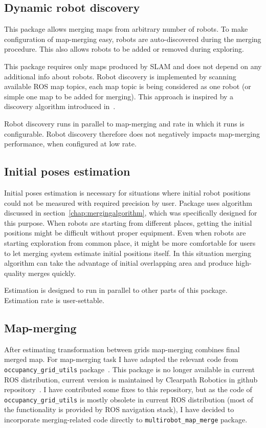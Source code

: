 \subsection{Dynamic robot discovery}

This package allows merging maps from arbitrary number of robots. To make configuration of map-merging easy, robots are auto-discovered during the merging procedure. This also allows robots to be added or removed during exploring.

This package requires only maps produced by \gls{SLAM} and does not depend on any additional info about robots. Robot discovery is implemented by scanning available \gls{ROS} map topics, each map topic is being considered as one robot (or simple one map to be added for merging). This approach is inspired by a discovery algorithm introduced in~\cite{Yan2014}.

Robot discovery runs in parallel to map-merging and rate in which it runs is configurable. Robot discovery therefore does not negatively impacts map-merging performance, when configured at low rate.

\subsection{Initial poses estimation}

Initial poses estimation is necessary for situations where initial robot positions could not be measured with required precision by user. Package uses algorithm discussed in section~\ref{chap:mergingalgorithm}, which was specifically designed for this purpose. When robots are starting from different places, getting the initial positions might be difficult without proper equipment. Even when robots are starting exploration from common place, it might be more comfortable for users to let merging system estimate initial positions itself. In this situation merging algorithm can take the advantage of initial overlapping area and produce high-quality merges quickly.

Estimation is designed to run in parallel to other parts of this package. Estimation rate is user-settable.

\subsection{Map-merging}

After estimating transformation between grids map-merging combines final merged map. For map-merging task I have adapted the relevant code from \texttt{occu\-pan\-cy\_grid\_uti\-ls} package~\cite{Marthi2014}. This package is no longer available in current \gls{ROS} distribution, current version is maintained by Clearpath Robotics in github repository~\cite{GitHubOccGridUtils}. I have contributed some fixes to this repository, but as the code of \texttt{occu\-pan\-cy\_grid\_uti\-ls} is mostly obsolete in current \gls{ROS} distribution (most of the functionality is provided by \gls{ROS} navigation stack), I have decided to incorporate merging-related code directly to \texttt{multi\-robot\_map\_merge} package.

